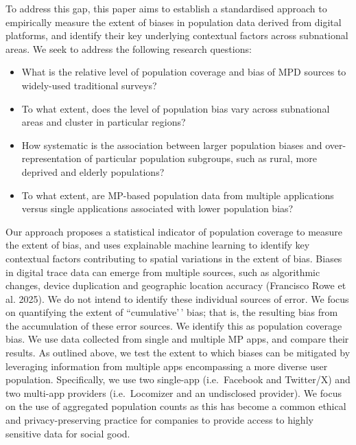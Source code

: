 \documentclass{article}
\providecommand{\tightlist}{%
  \setlength{\itemsep}{0pt}\setlength{\parskip}{0pt}}
\begin{document}
To address this gap, this paper aims to establish a standardised
approach to empirically measure the extent of biases in population data
derived from digital platforms, and identify their key underlying
contextual factors across subnational areas. We seek to address the
following research questions:

\begin{itemize}
\tightlist
\item
  What is the relative level of population coverage and bias of MPD
  sources to widely-used traditional surveys?
\item
  To what extent, does the level of population bias vary across
  subnational areas and cluster in particular regions?
\item
  How systematic is the association between larger population biases
  and over-representation of particular population subgroups, such as
  rural, more deprived and elderly populations?
\item
  To what extent, are MP-based population data from multiple
  applications versus single applications associated with lower
  population bias?
\end{itemize}

Our approach proposes a statistical indicator of population coverage to
measure the extent of bias, and uses explainable machine learning to
identify key contextual factors contributing to spatial variations in
the extent of bias. Biases in digital trace data can emerge from
multiple sources, such as algorithmic changes, device duplication and
geographic location accuracy (Francisco Rowe et al. 2025). We do not intend to
identify these individual sources of error. We focus on quantifying the
extent of ``cumulative'\,' bias; that is, the resulting bias from the
accumulation of these error sources. We identify this as population
coverage bias. We use data collected from single and multiple MP apps,
and compare their results. As outlined above, we test the extent to
which biases can be mitigated by leveraging information from multiple
apps encompassing a more diverse user population. Specifically, we use
two single-app (i.e.~Facebook and Twitter/X) and two multi-app providers
(i.e.~Locomizer and an undisclosed provider). We focus on the use of
aggregated population counts as this has become a common ethical and
privacy-preserving practice for companies to provide access to highly
sensitive data for social good.
\end{document}
